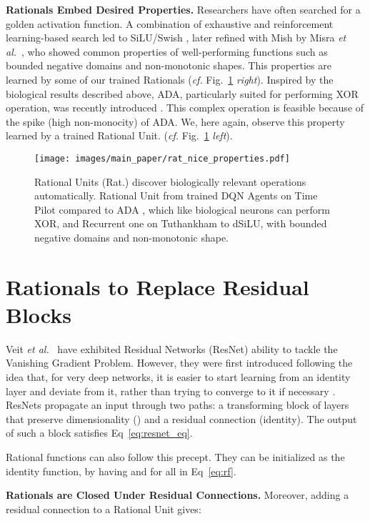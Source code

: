 \documentclass{article}
\newcommand{\etal}{\emph{et al.}~}
\begin{document}
\textbf{Rationals Embed Desired Properties.}
Researchers have often searched for a golden activation function. A combination of exhaustive and reinforcement learning-based search led to SiLU/Swish \cite{RamachandranSearching}, later refined with Mish by Misra \etal{}, who showed common properties of well-performing functions such as bounded negative domains and non-monotonic shapes. This properties are learned by some of our trained Rationals (\textit{cf.} Fig.~\ref{fig:rat_nice_props} \textit{right}).
Inspired by the biological results described above, ADA, particularly suited for performing XOR operation, was recently introduced \cite{georgescu2020non}. This complex operation is feasible because of the spike (high non-monocity) of ADA. We, here again, observe this property learned by a trained Rational Unit. (\textit{cf.} Fig.~\ref{fig:rat_nice_props} \textit{left}).

\begin{figure}[t]
    \centering
    \texttt{[image: images/main\_paper/rat\_nice\_properties.pdf]}
    \caption{Rational Units (Rat.) discover biologically relevant operations automatically. Rational Unit from trained DQN Agents on Time Pilot compared to ADA \cite{georgescu2020non}, which like biological neurons can perform XOR, and Recurrent one on Tuthankham to dSiLU, with bounded negative domains and non-monotonic shape.
    \label{fig:rat_nice_props}}
\end{figure}

\section{Rationals to Replace Residual Blocks}
Veit \etal{} have exhibited Residual 
Networks (ResNet) ability to tackle the Vanishing Gradient Problem. 
However, they were first introduced following the idea that, for very deep networks, it is easier to start learning from an identity layer and deviate from it, rather than trying to converge to it if necessary \cite{HeZRS16}.
ResNets propagate an input  through two paths: a transforming block of layers that preserve dimensionality () and a residual connection (identity). The output  of such a block satisfies Eq~\ref{eq:resnet_eq}.

Rational functions can also follow this precept. They can be initialized as the identity function, by having  and  for all  in Eq~\ref{eq:rf}. 

\textbf{Rationals are Closed Under Residual Connections.}
Moreover, adding a residual connection to a Rational Unit  gives:
\end{document}
